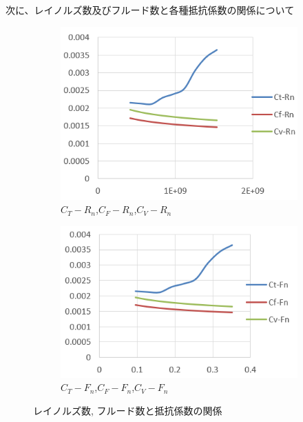 \documentclass[dvipdfmx,a4paper]{jreport} %
\begin{document}
\vspace{5mm}

次に、レイノルズ数及びフルード数と各種抵抗係数の関係について

\begin{figure}[H]
    \centering
    \begin{subfigure}[b]{0.45\textwidth}
    \includegraphics[width=\textwidth]{summer/ship-experiment/circulating-water-channel/c-rn.png}
        \caption{$C_T-R_n$,$C_F-R_n$,$C_V-R_n$}
        \label{fig:c-fn}
    \end{subfigure}
    \hfill
    \begin{subfigure}[b]{0.45\textwidth}
        \includegraphics[width=\textwidth]{summer/ship-experiment/circulating-water-channel/c-fn.png}
        \caption{$C_T-F_n$,$C_F-F_n$,$C_V-F_n$}
        \label{fig:c-fn}
    \end{subfigure}
    \caption{レイノルズ数, フルード数と抵抗係数の関係}
\end{figure}
\end{document}

